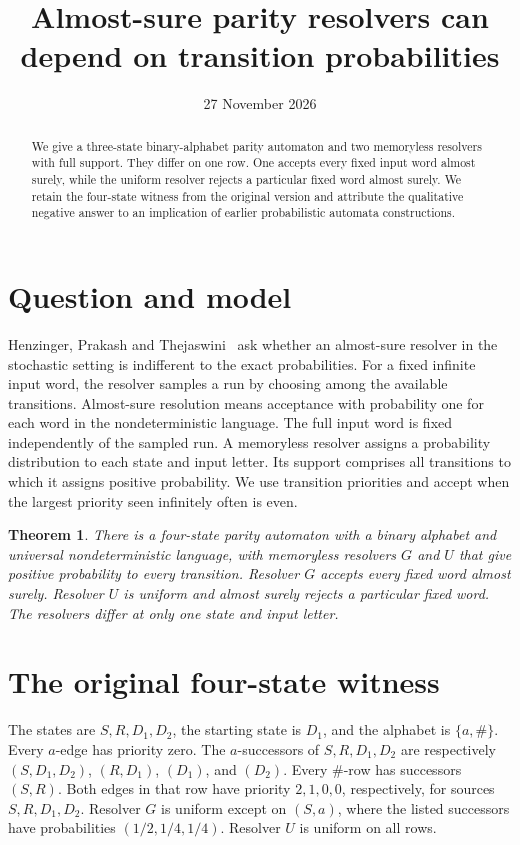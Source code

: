 \documentclass[11pt]{amsart}
\title{Almost-sure parity resolvers can depend on transition probabilities}
\date{27 November 2026}
\newtheorem{theorem}{Theorem}
\begin{document}
\begin{abstract}
We give a three-state binary-alphabet parity automaton and two memoryless resolvers with full support. They differ on one row. One accepts every fixed input word almost surely, while the uniform resolver rejects a particular fixed word almost surely. We retain the four-state witness from the original version and attribute the qualitative negative answer to an implication of earlier probabilistic automata constructions.
\end{abstract}
\maketitle

\section{Question and model}
Henzinger, Prakash and Thejaswini~\cite[\S6]{HPT} ask whether an almost-sure resolver in the stochastic setting is indifferent to the exact probabilities. For a fixed infinite input word, the resolver samples a run by choosing among the available transitions. Almost-sure resolution means acceptance with probability one for each word in the nondeterministic language. The full input word is fixed independently of the sampled run. A memoryless resolver assigns a probability distribution to each state and input letter. Its support comprises all transitions to which it assigns positive probability. We use transition priorities and accept when the largest priority seen infinitely often is even.

\begin{theorem}\label{thm:four}
There is a four-state parity automaton with a binary alphabet and universal nondeterministic language, with memoryless resolvers \(G\) and \(U\) that give positive probability to every transition. Resolver \(G\) accepts every fixed word almost surely. Resolver \(U\) is uniform and almost surely rejects a particular fixed word. The resolvers differ at only one state and input letter.
\end{theorem}

\section{The original four-state witness}\label{sec:four}
The states are \(S,R,D_1,D_2\), the starting state is \(D_1\), and the alphabet is \(\{a,\#\}\). Every \(a\)-edge has priority zero. The \(a\)-successors of \(S,R,D_1,D_2\) are respectively \((S,D_1,D_2)\), \((R,D_1)\), \((D_1)\), and \((D_2)\). Every \(\#\)-row has successors \((S,R)\). Both edges in that row have priority \(2,1,0,0\), respectively, for sources \(S,R,D_1,D_2\). Resolver \(G\) is uniform except on \((S,a)\), where the listed successors have probabilities \((1/2,1/4,1/4)\). Resolver \(U\) is uniform on all rows.
\end{document}
